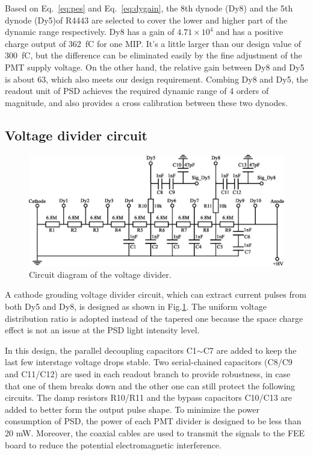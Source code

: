 \documentclass[preprint, times]{elsarticle}
\begin{document}
Based on Eq.~\ref{eq:pes} and  Eq.~\ref{eq:dygain}, the 8th dynode (Dy8) and the 5th dynode (Dy5)of R4443 are selected to cover the lower and higher part of the dynamic range respectively.
Dy8 has a gain of $4.71\times10^4$ and has a positive charge output of \SI{362} {\femto\coulomb} for one MIP. 
It's a little larger than our design value of \SI{300} {\femto\coulomb}, but the difference can be eliminated easily by the fine adjustment of the PMT supply voltage. 
On the other hand, the relative gain between Dy8 and Dy5 is about 63, which also meets our design requirement.
Combing Dy8 and Dy5, the readout unit of PSD achieves the required dynamic range of 4 orders of magnitude, and also provides a cross calibration between these two dynodes.

\subsection{Voltage divider circuit}
\label{sec:divider_design}

\begin{figure}
\centering
 \includegraphics[width=130mm]{divider}
\caption{Circuit diagram of the voltage divider.}
\label{fig:divider}
\end{figure}

A cathode grouding voltage divider circuit, which can extract current pulses from both Dy5 and Dy8, is designed as shown in Fig.\ref{fig:divider}.
The uniform voltage distribution ratio is adopted instead of the tapered one because the space charge effect is not an issue at the PSD light intensity level.

In this design, the parallel decoupling capacitors C1$\sim$C7 are added to keep the last few interstage voltage drops stable. Two serial-chained capacitors (C8/C9 and C11/C12) are used in each readout branch to provide robustness, in case that one of them breaks down and the other one can still protect the following circuits. 
The damp resistors R10/R11 and the bypass capacitors C10/C13 are added to better form the output pulse shape. 
To minimize the power consumption of PSD, the power of each PMT divider is designed to be less than 20 mW. 
Moreover, the coaxial cables are used to transmit the signals to the FEE board to reduce the potential electromagnetic interference.
\end{document}
